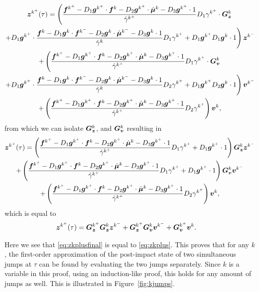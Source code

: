 \documentclass[../DC2017114Bouma.tex]{subfiles}
\begin{document}
\begin{multline}
\zb^{k^+}(\tau) = \left(\frac{\fb^{k^+} - D_1\gb^{k^+}\cdot\fb^{k} - D_2\gb^{k^+}\cdot\dot{\mub}^{k} - D_3\gb^{k^+}\cdot 1}{\dot{\gamma}^{k^+}}D_1\gamma^{k^+}\cdot\Gb_\zb^{k}\right.\\
\left. + D_1\gb^{k^+}\cdot\frac{\fb^{k} - D_1\gb^{k}\cdot\fb^{k^-} - D_2\gb^{k}\cdot\dot{\mub}^{k^-} - D_3\gb^{k}\cdot 1}{\dot{\gamma}^{k}}D_1\gamma^{k^+} + D_1\gb^{k^+} D_1\gb^{k}\cdot 1\right)\zb^{k^-}\\
+ \left(\frac{\fb^{k^+}-D_1\gb^{k^+}\cdot\fb^{k} -D_2\gb^{k^+}\cdot\dot{\mub}^{k} - D_3\gb^{k^+}\cdot 1}{\dot{\gamma}^{k^+}}D_1\gamma^{k^+}\cdot\Gb_\vb^{k}\right.\\
\left. + D_1\gb^{k^+}\cdot\frac{\fb^{k}-D_1\gb^{k}\cdot\fb^{k^-}-D_2\gb^{k}\cdot\dot{\mub}^{k^-}-D_3\gb^{k}\cdot 1}{\dot{\gamma}^{k}}D_2\gamma^{k^+} + D_1\gb^{k^+} D_2\gb^{k}\cdot 1 \right)\vb^{k^-}\\
+ \left(\frac{\fb^{k^+}-D_1\gb^{k^+}\cdot\fb^{k} - D_2\gb^{k^+}\cdot\dot{\mub}^{k} - D_3\gb^{k^+}\cdot 1}{\dot{\gamma}^{k^+}}D_2\gamma^{k^+}\right)\vb^{k},
\end{multline}
from which we can isolate $\Gb_\zb^{k}$, and $\Gb_\vb^{k}$ resulting in
\begin{multline}
\zb^{k^+}(\tau) = \left(\frac{\fb^{k^+} - D_1\gb^{k^+}\cdot\fb^{k}  - D_2\gb^{k^+}\cdot\dot{\mub}^{k} - D_3\gb^{k^+}\cdot 1}{\dot{\gamma}^{k^+}}D_1\gamma^{k^+} + D_1\gb^{k^+}\cdot 1\right)\Gb_\zb^{k}\zb^{k^-}\\
+ \left(\frac{\fb^{k^+} - D_1\gb^{k^+}\cdot\fb^{k} - D_2\gb^{k^+}\cdot\dot{\mub}^{k} - D_3\gb^{k^+}\cdot 1}{\dot{\gamma}^{k^+}}D_1\gamma^{k^+} + D_1\gb^{k^+}\cdot 1\right)\Gb_\vb^{k}\vb^{k^-} \\
+ \left(\frac{\fb^{k^+}-D_1\gb^{k^+}\cdot\fb^{k} - D_2\gb^{k^+}\cdot\dot{\mub}^{k} - D_3\gb^{k^+}\cdot 1}{\dot{\gamma}^{k^+}}D_2\gamma^{k^+}\right)\vb^{k},
\end{multline}
which is equal to
\begin{align}
&\zb^{k^+}(\tau) = \Gb_\zb^{k^+}\Gb_\zb^k\zb^{k^-} + \Gb_\zb^{k^+}\Gb_\vb^k\vb^{k^-} + \Gb_\vb^{k^+}\vb^{k}.\label{eq:zkplusfinal}
\end{align}

Here we see that \eqref{eq:zkplusfinal} is equal to \eqref{eq:zkplus}. This proves that for any $k$, the first-order approximation of the post-impact state of two simultaneous jumps at $\tau$ can be found by evaluating the two jumps separately. Since $k$ is a variable in this proof, using an induction-like proof, this holds for any amount of jumps as well. This is illustrated in Figure~\ref{fig:kjumps}. 
\end{document}
